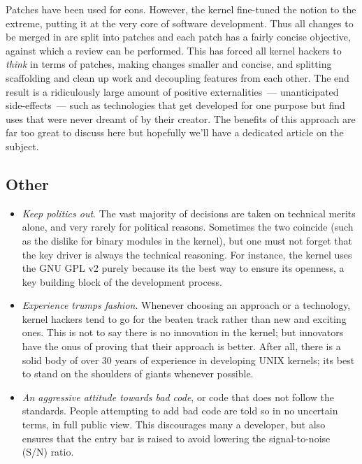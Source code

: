 \documentclass{book}
\begin{document}
Patches have been used for eons. However, the kernel fine-tuned the
notion to the extreme, putting it at the very core of software
development. Thus all changes to be merged in are split into patches
and each patch has a fairly concise objective, against which a review
can be performed. This has forced all kernel hackers to \emph{think}
in terms of patches, making changes smaller and concise, and splitting
scaffolding and clean up work and decoupling features from each
other. The end result is a ridiculously large amount of positive
externalities~--- unanticipated side-effects~--- such as technologies
that get developed for one purpose but find uses that were never
dreamt of by their creator. The benefits of this approach are far too
great to discuss here but hopefully we'll have a dedicated article on
the subject.

\subsection{Other}

\begin{itemize}
\item \emph{Keep politics out}. The vast majority of decisions are
  taken on technical merits alone, and very rarely for political
  reasons. Sometimes the two coincide (such as the dislike for binary
  modules in the kernel), but one must not forget that the key driver
  is always the technical reasoning. For instance, the kernel uses the
  GNU GPL v2 purely because its the best way to ensure its openness, a
  key building block of the development process.
\item \emph{Experience trumps fashion}. Whenever choosing an approach
  or a technology, kernel hackers tend to go for the beaten track
  rather than new and exciting ones. This is not to say there is no
  innovation in the kernel; but innovators have the onus of proving
  that their approach is better. After all, there is a solid body of
  over 30 years of experience in developing UNIX kernels; its best to
  stand on the shoulders of giants whenever possible.
\item \emph{An aggressive attitude towards bad code}, or code that
  does not follow the standards. People attempting to add bad code are
  told so in no uncertain terms, in full public view. This discourages
  many a developer, but also ensures that the entry bar is raised to
  avoid lowering the signal-to-noise (S/N) ratio.
\end{itemize}
\end{document}
